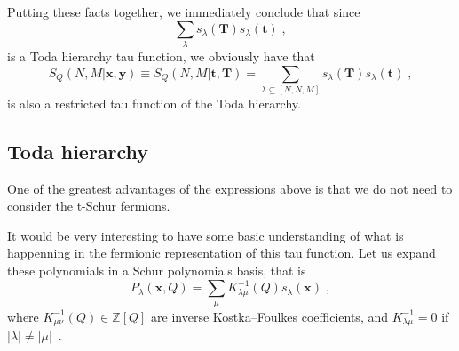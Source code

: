 \documentclass[a4paper,11pt]{amsart}
\begin{document}
Putting these facts together, we immediately conclude that since 
\begin{equation}
  \sum_\lambda s_\lambda(\bm{T}) s_\lambda (\bm{t}) \; ,
\end{equation}
is a Toda hierarchy tau function, we obviously have that 
\begin{equation}
  S_Q(N,M| \bm{x}, \bm{y}) \equiv S_Q(N,M| \bm{t}, \bm{T})
  = \sum_{\lambda \subseteq [N,N,M]} s_\lambda(\bm{T}) s_\lambda(\bm{t})\; , 
\end{equation}
is also a restricted tau function of the Toda hierarchy.


\subsection{Toda hierarchy}

One of the greatest advantages of the expressions above is that we do not 
need to consider the t-Schur fermions.

It would be very interesting to have some basic understanding of what
is happenning in the fermionic representation of this tau function.
Let us expand these polynomials in a Schur polynomials basis, that is
\begin{equation}
P_\lambda(\bm{x}, Q) = \sum_{\mu} K^{-1}_{\lambda \mu}(Q) s_\lambda(\bm{x})\; , 
\end{equation}
where \(K^{-1}_{\mu\nu}(Q) \in \mathbb{Z}[Q]\) are inverse
Kostka–Foulkes coefficients, and \(K^{-1}_{\lambda\mu} = 0 \) if
\(|\lambda|\neq |\mu|\)~\cite{Macdonald:1998, Wheeler:2018}.
\end{document}
